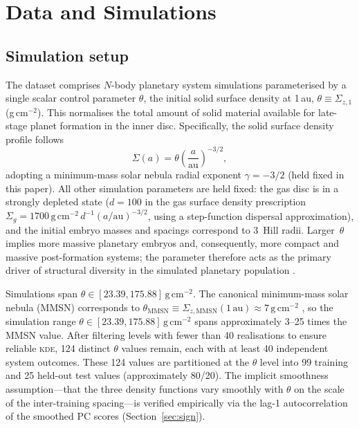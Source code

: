 \documentclass[12pt,a4paper]{article}
\newcommand{\KDE}{\textsc{kde}}
\newcommand{\spar}{\theta}
\begin{document}
\section{Data and Simulations}
\label{sec:data}

\subsection{Simulation setup}
\label{sec:simsetup}

The dataset comprises $N$-body planetary system simulations
parameterised by a single scalar control parameter $\theta$, the
initial solid surface density at 1\,au,
$\theta\equiv\Sigma_{z,1}$ (g\,cm$^{-2}$).
This normalises the total amount of solid material available
for late-stage planet formation in the inner disc.  Specifically,
the solid surface density profile follows
\begin{equation}
  \Sigma(a) = \theta\left(\frac{a}{\mathrm{au}}\right)^{-3/2},
  \label{eq:sigma_profile}
\end{equation}
adopting a minimum-mass solar nebula radial exponent $\gamma=-3/2$ (held fixed in this paper).
All other simulation parameters are held fixed: the gas disc is in
a strongly depleted state ($d=100$ in the gas surface density
prescription $\Sigma_g=1700\,\mathrm{g\,cm^{-2}}\,d^{-1}
(a/\mathrm{au})^{-3/2}$, using a step-function dispersal
approximation), and the initial embryo masses and spacings correspond
to 3~Hill radii.  Larger~$\spar$ implies more massive planetary
embryos and, consequently, more compact and massive post-formation
systems; the parameter therefore acts as the primary driver of
structural diversity in the simulated planetary population
\citep{macdonald2020}.

Simulations span $\spar\in[23.39,175.88]\,\mathrm{g\,cm^{-2}}$.
The canonical minimum-mass solar nebula (MMSN) corresponds to
$\theta_\mathrm{MMSN}\equiv\Sigma_{z,\mathrm{MMSN}}(1\,\mathrm{au})
\approx7\,\mathrm{g\,cm^{-2}}$ \citep{hayashi1981},
so the simulation range $\theta\in[23.39,175.88]\,\mathrm{g\,cm^{-2}}$
spans approximately 3--25 times the MMSN value.
After filtering levels
with fewer than 40 realisations to ensure reliable \KDE, 124 distinct
$\spar$ values remain, each with at least 40 independent system
outcomes.  These 124 values are partitioned at the $\spar$ level into
99 training and 25 held-out test values (approximately 80/20).  The
implicit smoothness assumption---that the three density functions vary
smoothly with $\spar$ on the scale of the inter-training spacing---is
verified empirically via the lag-1 autocorrelation of the smoothed PC
scores (Section~\ref{sec:sign}).
\end{document}
